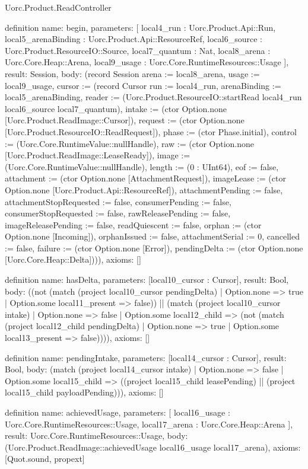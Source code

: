 \begin{lexlean}{Uorc.Product.ReadController}
\begin{semanticmodule}
definition{
  name: begin,
  parameters: [
    local4_run : Uorc.Product.Api::Run,
    local5_arenaBinding : Uorc.Product.Api::ResourceRef,
    local6_source : Uorc.Product.ResourceIO::Source,
    local7_quantum : Nat,
    local8_arena : Uorc.Core.Heap::Arena,
    local9_usage : Uorc.Core.RuntimeResources::Usage
  ],
  result: Session,
  body: (record Session {arena := local8_arena, usage := local9_usage, cursor := (record Cursor {run := local4_run, arenaBinding := local5_arenaBinding, reader := (Uorc.Product.ResourceIO::startRead local4_run local6_source local7_quantum), intake := (ctor Option.none [Uorc.Product.ReadImage::Cursor]), request := (ctor Option.none [Uorc.Product.ResourceIO::ReadRequest]), phase := (ctor Phase.initial), control := (Uorc.Core.RuntimeValue::nullHandle), raw := (ctor Option.none [Uorc.Product.ReadImage::LeaseReady]), image := (Uorc.Core.RuntimeValue::nullHandle), length := (0 : UInt64), eof := false, attachment := (ctor Option.none [AttachmentRequest]), imageLease := (ctor Option.none [Uorc.Product.Api::ResourceRef]), attachmentPending := false, attachmentStopRequested := false, consumerPending := false, consumerStopRequested := false, rawReleasePending := false, imageReleasePending := false, readQuiescent := false, orphan := (ctor Option.none [Incoming]), orphanIssued := false, attachmentSerial := 0, cancelled := false, failure := (ctor Option.none [Error]), pendingDelta := (ctor Option.none [Uorc.Core.Heap::Delta])})}),
  axioms: []
}

definition{
  name: hasDelta,
  parameters: [local10_cursor : Cursor],
  result: Bool,
  body: ((not (match (project local10_cursor pendingDelta)
    | Option.none => true
    | Option.some local11_present => false)) || (match (project local10_cursor intake)
    | Option.none => false
    | Option.some local12_child => (not (match (project local12_child pendingDelta)
      | Option.none => true
      | Option.some local13_present => false)))),
  axioms: []
}

definition{
  name: pendingIntake,
  parameters: [local14_cursor : Cursor],
  result: Bool,
  body: (match (project local14_cursor intake)
    | Option.none => false
    | Option.some local15_child => ((project local15_child leasePending) || (project local15_child payloadPending))),
  axioms: []
}

definition{
  name: achievedUsage,
  parameters: [
    local16_usage : Uorc.Core.RuntimeResources::Usage,
    local17_arena : Uorc.Core.Heap::Arena
  ],
  result: Uorc.Core.RuntimeResources::Usage,
  body: (Uorc.Product.ReadImage::achievedUsage local16_usage local17_arena),
  axioms: [Quot.sound, propext]
}


\end{semanticmodule}
\end{lexlean}
